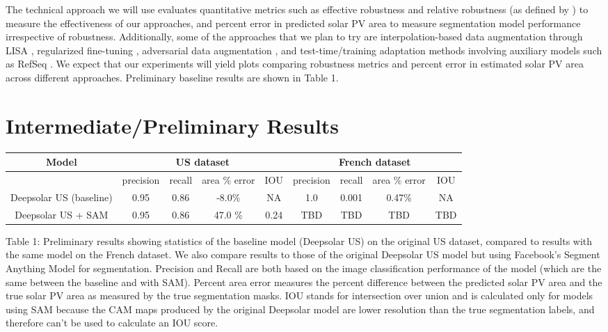 \documentclass[10pt,twocolumn,letterpaper]{article}
\begin{document}
The technical approach we will use evaluates quantitative metrics such as effective robustness and relative robustness (as defined by \cite{Taori2020}) to measure the effectiveness of our approaches, and percent error in predicted solar PV area to measure segmentation model performance irrespective of robustness.  Additionally, some of the approaches that we plan to try are interpolation-based data augmentation through LISA \cite{yao2022improving}, regularized fine-tuning \cite{li2021}, adversarial data augmentation \cite{volpi2018generalizing}, and test-time/training adaptation methods involving auxiliary models such as RefSeq \cite{huang2022online}. We expect that our experiments will yield plots comparing robustness metrics and percent error in estimated solar PV area across different approaches. Preliminary baseline results are shown in Table 1.

\section{Intermediate/Preliminary Results}
\begin{tabular}{||c | c | c | c | c | c | c | c  | c ||}
\hline
Model & \multicolumn{4}{c|}{US dataset} & \multicolumn{4}{c|}{French dataset} \\ [0.5ex] 
\hline\hline
{} & precision & recall & area \% error & IOU & precision & recall & area \% error & IOU \\ 
\hline
Deepsolar US (baseline) & 0.95 & 0.86 & -8.0\% & NA & 1.0 & 0.001 & 0.47\% & NA \\ 
\hline
Deepsolar US + SAM &  0.95 & 0.86 & 47.0 \% & 0.24 & TBD & TBD & TBD & TBD\\ 
\hline

\end{tabular}
\begin{center}

 Table 1: Preliminary results showing statistics of the baseline model (Deepsolar US) on the original US dataset, compared to results with the same model on the French dataset. We also compare results to those of the original Deepsolar US model but using Facebook's Segment Anything Model for segmentation. Precision and Recall are both based on the image classification performance of the model (which are the same between the baseline and with SAM). Percent area error measures the percent difference between the predicted solar PV area and the true solar PV area as measured by the true segmentation masks. IOU stands for intersection over union and is calculated only for models using SAM because the CAM maps produced by the original Deepsolar model are lower resolution than the true segmentation labels, and therefore can't be used to calculate an IOU score. 


\end{center}
\end{document}
